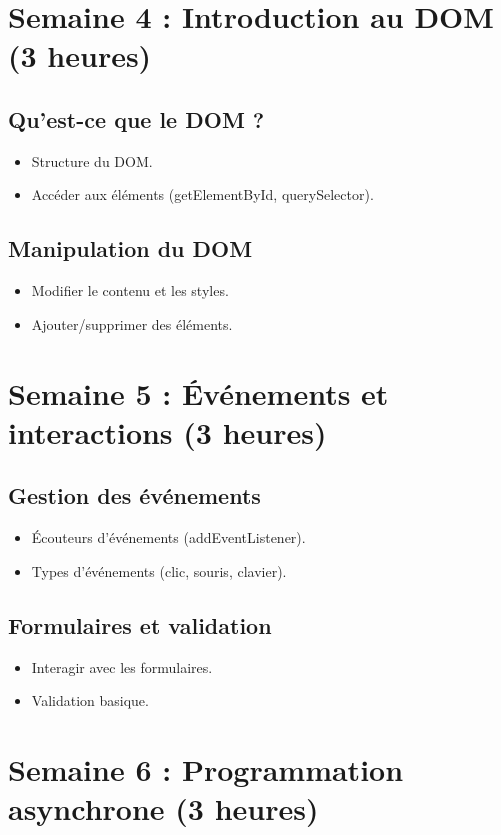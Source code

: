 \documentclass[12pt]{article}
\begin{document}
\section*{Semaine 4 : Introduction au DOM (3 heures)}
\subsection*{Qu'est-ce que le DOM ? }
\begin{itemize}
    \item Structure du DOM.
    \item Accéder aux éléments (getElementById, querySelector).
\end{itemize}

\subsection*{Manipulation du DOM }
\begin{itemize}
    \item Modifier le contenu et les styles.
    \item Ajouter/supprimer des éléments.
\end{itemize}

\section*{Semaine 5 : Événements et interactions (3 heures)}
\subsection*{Gestion des événements }
\begin{itemize}
    \item Écouteurs d'événements (addEventListener).
    \item Types d'événements (clic, souris, clavier).
\end{itemize}

\subsection*{Formulaires et validation }
\begin{itemize}
    \item Interagir avec les formulaires.
    \item Validation basique.
\end{itemize}

\section*{Semaine 6 : Programmation asynchrone (3 heures)}
\end{document}
